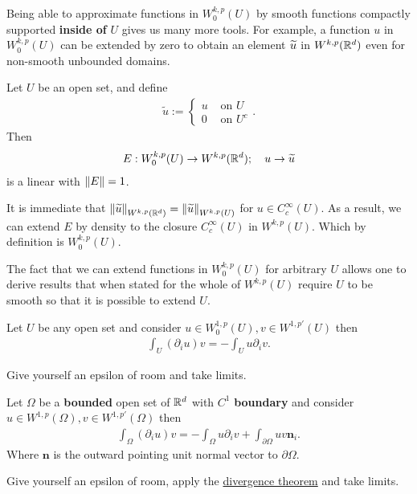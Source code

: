 \documentclass[
    a4paper,
    DIV=14,
    abstract=true,
    numbers=noenddot
]{scrartcl}
\begin{document}
Being able to approximate functions in $W_0^{k,p}(U)$ by smooth functions compactly supported  \textbf{inside of} $U$  gives us many more tools. For example, a function $u$ in $W^{k,p}_0(U)$ can be extended by zero to obtain an element $\widetilde{u}$ in $W^{k,p}(\mathbb{R}^d)$ even for non-smooth unbounded domains.
\begin{exercise}\label{extensiontrace}
	Let $U$ be an open set,     and define
	\begin{align*}
		\widetilde{u}:=\begin{cases}
			               u & \text{ on } U   \\
			               0 & \text{ on } U^c
		               \end{cases}.
	\end{align*}
	Then
	\begin{align*}
		E: W_0^{k,p}(U) \to W^{k,p}(\mathbb{R}^d); \quad  u \to \widetilde{u}
	\end{align*}
	is a linear with $\left\lVert E \right\rVert=1$.
\end{exercise}
\begin{hint}
	It is immediate that $\left\lVert \widetilde{u} \right\rVert_{W^{k,p}(\mathbb{R}^d)}=\left\lVert \widetilde{u} \right\rVert_{W^{k,p}(U)}$ for $u \in C_c^\infty(U)$. As a result, we can extend $E$ by density to the closure $C_c^\infty(U)$ in $W^{k,p}(U)$. Which by definition is  $W^{k,p}_0(U)$.
\end{hint}
\begin{observation}\label{traceobs}
	The fact that we can extend functions in $W^{k,p}_0(U)$ for arbitrary  $U$ allows one to derive results that when stated for the whole of $W^{k,p}(U)$ require $U$ to be smooth so that it is possible to extend $U$.
\end{observation}
\begin{exercise} Let $U$ be any open set and consider $u \in  W^{1,p}_0(U), v \in W^{1,p'}(U)$ then
	\begin{align*}
		\int_{U} (\partial _iu) v = -\int_{U}u \partial _i v  .
	\end{align*}
\end{exercise}
\begin{hint}
	Give yourself an epsilon of room and take limits.
\end{hint}
\begin{exercise} Let $\Omega $ be a \textbf{bounded} open set of $\mathbb{R}^d$ with $C^1$  \textbf{boundary} and consider $u \in  W^{1,p}(\Omega), v \in W^{1,p'}(\Omega)$ then
	\begin{align*}
		\int_{\Omega} (\partial _iu) v = -\int_{\Omega}u \partial _i v+ \int_{\partial \Omega} u v \textbf{n}_i .
	\end{align*}
	Where $\textbf{n} $ is the outward pointing unit normal vector to $\partial \Omega$.
\end{exercise}
\begin{hint}
	Give yourself an epsilon of room, apply the \href{https://en.wikipedia.org/wiki/Divergence_theorem#:~:text=space%5Bedit%5D-,We,-are%20going%20to%20prove}{divergence theorem} and take limits.
\end{hint}
\end{document}
